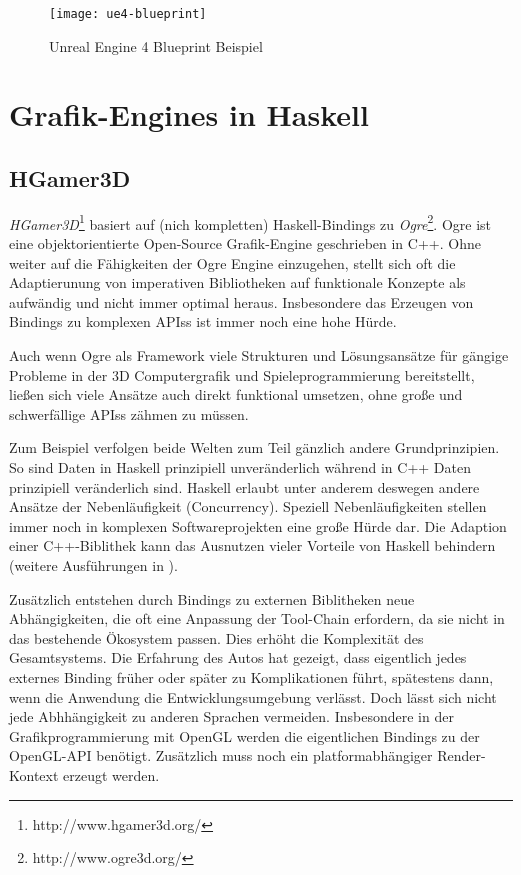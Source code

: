 \begin{figure}
\centering
\texttt{[image: ue4-blueprint]}
\caption{Unreal Engine 4 Blueprint Beispiel}
\end{figure}



\section{Grafik-Engines in Haskell}

\subsection{HGamer3D}

\textit{HGamer3D}\footnote{http://www.hgamer3d.org/} basiert auf (nich kompletten) Haskell-Bindings zu \textit{Ogre}\footnote{http://www.ogre3d.org/}. Ogre ist eine objektorientierte Open-Source Grafik-Engine geschrieben in C++. Ohne weiter auf die Fähigkeiten der Ogre Engine einzugehen, stellt sich oft die Adaptierunung von imperativen Bibliotheken auf funktionale Konzepte als aufwändig und nicht immer optimal heraus. Insbesondere das Erzeugen von Bindings zu komplexen \acsp{API}s ist immer noch eine hohe Hürde.

Auch wenn Ogre als Framework viele Strukturen und Lösungsansätze für gängige Probleme in der 3D Computergrafik und Spieleprogrammierung bereitstellt, ließen sich viele Ansätze auch direkt funktional umsetzen, ohne große und schwerfällige \acsp{API}s zähmen zu müssen.

Zum Beispiel verfolgen beide Welten zum Teil gänzlich andere Grundprinzipien. So sind Daten in Haskell prinzipiell unveränderlich während in C++ Daten prinzipiell veränderlich sind. Haskell erlaubt unter anderem deswegen andere Ansätze der Nebenläufigkeit (Concurrency). Speziell Nebenläufigkeiten stellen immer noch in komplexen Softwareprojekten eine große Hürde dar. Die Adaption einer C++-Biblithek kann das Ausnutzen vieler Vorteile von Haskell behindern (weitere Ausführungen in ).

Zusätzlich entstehen durch Bindings zu externen Biblitheken neue Abhängigkeiten, die oft eine Anpassung der Tool-Chain erfordern, da sie nicht in das bestehende Ökosystem passen. Dies erhöht die Komplexität des Gesamtsystems. Die Erfahrung des Autos hat gezeigt, dass eigentlich jedes externes Binding früher oder später zu Komplikationen führt, spätestens dann, wenn die Anwendung die Entwicklungsumgebung verlässt. Doch lässt sich nicht jede Abhhängigkeit zu anderen Sprachen vermeiden. Insbesondere in der Grafikprogrammierung mit OpenGL werden die eigentlichen Bindings zu der OpenGL-API benötigt. Zusätzlich muss noch ein platformabhängiger Render-Kontext erzeugt werden.

